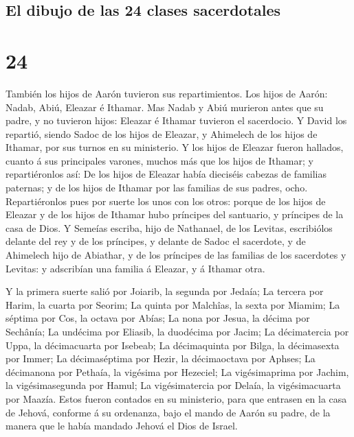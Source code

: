 \hypertarget{el-dibujo-de-las-24-clases-sacerdotales}{%
\subsection{El dibujo de las 24 clases
sacerdotales}\label{el-dibujo-de-las-24-clases-sacerdotales}}

\hypertarget{section-13-24}{%
\section{24}\label{section-13-24}}

 También los hijos de Aarón tuvieron sus repartimientos.
Los hijos de Aarón: Nadab, Abiú, Eleazar é Ithamar.  Mas
Nadab y Abiú murieron antes que su padre, y no tuvieron hijos: Eleazar é
Ithamar tuvieron el sacerdocio.  Y David los repartió,
siendo Sadoc de los hijos de Eleazar, y Ahimelech de los hijos de
Ithamar, por sus turnos en su ministerio.  Y los hijos de
Eleazar fueron hallados, cuanto á sus principales varones, muchos más
que los hijos de Ithamar; y repartiéronlos así: De los hijos de Eleazar
había dieciséis cabezas de familias paternas; y de los hijos de Ithamar
por las familias de sus padres, ocho.  Repartiéronlos pues
por suerte los unos con los otros: porque de los hijos de Eleazar y de
los hijos de Ithamar hubo príncipes del santuario, y príncipes de la
casa de Dios.  Y Semeías escriba, hijo de Nathanael, de
los Levitas, escribiólos delante del rey y de los príncipes, y delante
de Sadoc el sacerdote, y de Ahimelech hijo de Abiathar, y de los
príncipes de las familias de los sacerdotes y Levitas: y adscribían una
familia á Eleazar, y á Ithamar otra.

 Y la primera suerte salió por Joiarib, la segunda por
Jedaía;  La tercera por Harim, la cuarta por Seorim;
 La quinta por Malchîas, la sexta por Miamim;
 La séptima por Cos, la octava por Abías; 
La nona por Jesua, la décima por Sechânía;  La undécima
por Eliasib, la duodécima por Jacim;  La décimatercia por
Uppa, la décimacuarta por Isebeab;  La décimaquinta por
Bilga, la décimasexta por Immer;  La décimaséptima por
Hezir, la décimaoctava por Aphses;  La décimanona por
Pethaía, la vigésima por Hezeciel;  La vigésimaprima por
Jachim, la vigésimasegunda por Hamul;  La vigésimatercia
por Delaía, la vigésimacuarta por Maazía.  Estos fueron
contados en su ministerio, para que entrasen en la casa de Jehová,
conforme á su ordenanza, bajo el mando de Aarón su padre, de la manera
que le había mandado Jehová el Dios de Israel.


